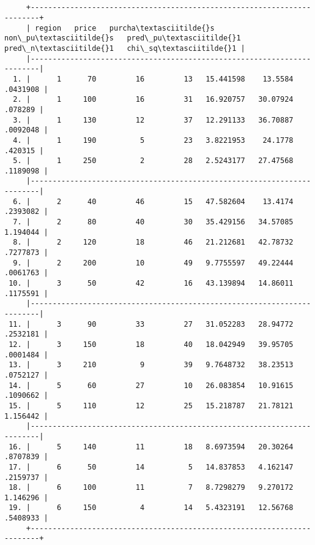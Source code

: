 \documentclass[11pt]{article}
\begin{document}
    \begin{Verbatim}[commandchars=\\\{\}]


     +------------------------------------------------------------------------+
     | region   price   purcha\textasciitilde{}s   non\_pu\textasciitilde{}s   pred\_pu\textasciitilde{}1   pred\_n\textasciitilde{}1   chi\_sq\textasciitilde{}1 |
     |------------------------------------------------------------------------|
  1. |      1      70         16         13   15.441598    13.5584   .0431908 |
  2. |      1     100         16         31   16.920757   30.07924    .078289 |
  3. |      1     130         12         37   12.291133   36.70887   .0092048 |
  4. |      1     190          5         23   3.8221953    24.1778    .420315 |
  5. |      1     250          2         28   2.5243177   27.47568   .1189098 |
     |------------------------------------------------------------------------|
  6. |      2      40         46         15   47.582604    13.4174   .2393082 |
  7. |      2      80         40         30   35.429156   34.57085   1.194044 |
  8. |      2     120         18         46   21.212681   42.78732   .7277873 |
  9. |      2     200         10         49   9.7755597   49.22444   .0061763 |
 10. |      3      50         42         16   43.139894   14.86011   .1175591 |
     |------------------------------------------------------------------------|
 11. |      3      90         33         27   31.052283   28.94772   .2532181 |
 12. |      3     150         18         40   18.042949   39.95705   .0001484 |
 13. |      3     210          9         39   9.7648732   38.23513   .0752127 |
 14. |      5      60         27         10   26.083854   10.91615   .1090662 |
 15. |      5     110         12         25   15.218787   21.78121   1.156442 |
     |------------------------------------------------------------------------|
 16. |      5     140         11         18   8.6973594   20.30264   .8707839 |
 17. |      6      50         14          5   14.837853   4.162147   .2159737 |
 18. |      6     100         11          7   8.7298279   9.270172   1.146296 |
 19. |      6     150          4         14   5.4323191   12.56768   .5408933 |
     +------------------------------------------------------------------------+



\end{Verbatim}
\end{document}
